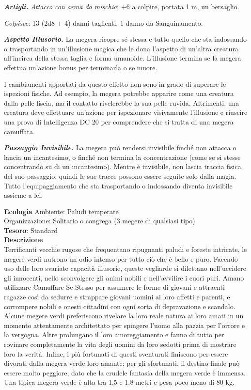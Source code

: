 \begin{multicols}{2}
	\textit{\textbf{Artigli.} Attacco con arma da mischia}: +6 a colpire, portata 1 m, un bersaglio.

	\textit{Colpisce:} 13 (2d8 + 4) danni taglienti, 1 danno da Sanguinamento.

	\textit{\textbf{Aspetto Illusorio.}} La megera ricopre sé stessa e tutto quello che sta indossando o trasportando in un'illusione magica che le dona l'aspetto di un'altra creatura all'incirca della stessa taglia e forma umanoide. L'illusione termina se la megera effettua un'azione bonus per terminarla o se muore.

	I cambiamenti apportati da questo effetto non sono in grado di superare le ispezioni fisiche. Ad esempio, la megera potrebbe apparire come una creatura dalla pelle liscia, ma il contatto rivelerebbe la sua pelle ruvida. Altrimenti, una creatura deve effettuare un'azione per ispezionare visivamente l'illusione e riuscire una prova di Intelligenza DC 20 per comprendere che si tratta di una megera camuffata.

	\textit{\textbf{Passaggio Invisibile.}} La megera può rendersi invisibile finché non attacca o lancia un incantesimo, o finché non termina la concentrazione (come se si stesse concentrando su di un incantesimo). Mentre è invisibile, non lascia traccia fisica del suo passaggio, quindi le sue tracce possono essere seguite solo dalla magia. Tutto l'equipaggiamento che sta trasportando o indossando diventa invisibile assieme a lei.

	\textbf{Ecologia}
	Ambiente: Paludi temperate\\
	Organizzazione: Solitario o congrega (3 megere di qualsiasi tipo)\\
	\textbf{Tesoro}: Standard\\
	\textbf{Descrizione}\\
	Terrificanti vecchie rugose che frequentano ripugnanti paludi e foreste intricate, le megere verdi nutrono un odio intenso per tutto ciò che è bello e puro. Facendo uso delle loro svariate capacità illusorie, queste vegliarde si dilettano nell'uccidere gli innocenti, nello sconvolgere gli animi nobili e nell'avvilire i cuori puri. Amano utilizzare Camuffare Se Stesso per assumere le forme di giovani e attraenti ragazze così da sedurre e strappare giovani uomini ai loro affetti e parenti, e corrompere nobili e onesti cittadini con ogni sorta di depravazione e scandalo. Alcune megere verdi preferiscono rivelare la loro reale natura ai loro amati in un momento attentamente architettato per spingere l'uomo alla pazzia per l'orrore e la vergogna. Altre prolungano il loro amoreggiamento e fanno di tutto per rovinare completamente la vita degli uomini da loro sedotti prima di mostrare loro la verità. Infine, i più fortunati di questi sventurati finiscono per essere divorati dalla megera verde loro amante: per gli sfortunati, il destino finale può essere molto peggiore, dato che la crudele fantasia della megera verde è immensa. Una tipica megera verde è alta tra 1,5 e 1,8 metri e pesa poco meno di 80 kg.



\end{multicols}

